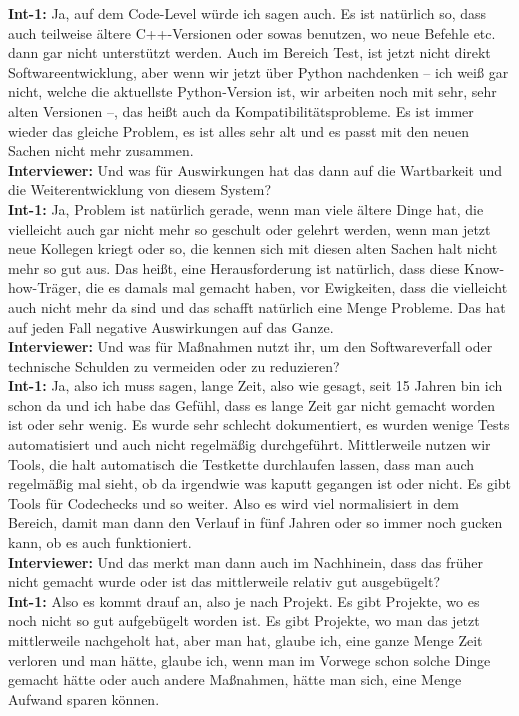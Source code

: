 \textbf{Int-1:} Ja, auf dem Code-Level würde ich sagen auch. Es ist natürlich so, dass auch teilweise ältere C++-Versionen oder sowas benutzen, wo neue Befehle etc. dann gar nicht unterstützt werden. Auch im Bereich Test, ist jetzt nicht direkt Softwareentwicklung, aber wenn wir jetzt über Python nachdenken – ich weiß gar nicht, welche die aktuellste Python-Version ist, wir arbeiten noch mit sehr, sehr alten Versionen –, das heißt auch da Kompatibilitätsprobleme. Es ist immer wieder das gleiche Problem, es ist alles sehr alt und es passt mit den neuen Sachen nicht mehr zusammen.\\
\textbf{Interviewer:} Und was für Auswirkungen hat das dann auf die Wartbarkeit und die Weiterentwicklung von diesem System?\\
\textbf{Int-1:} Ja, Problem ist natürlich gerade, wenn man viele ältere Dinge hat, die vielleicht auch gar nicht mehr so geschult oder gelehrt werden, wenn man jetzt neue Kollegen kriegt oder so, die kennen sich mit diesen alten Sachen halt nicht mehr so gut aus. Das heißt, eine Herausforderung ist natürlich, dass diese Know-how-Träger, die es damals mal gemacht haben, vor Ewigkeiten, dass die vielleicht auch nicht mehr da sind und das schafft natürlich eine Menge Probleme. Das hat auf jeden Fall negative Auswirkungen auf das Ganze.\\
\textbf{Interviewer:} Und was für Maßnahmen nutzt ihr, um den Softwareverfall oder technische Schulden zu vermeiden oder zu reduzieren?\\
\textbf{Int-1:} Ja, also ich muss sagen, lange Zeit, also wie gesagt, seit 15 Jahren bin ich schon da und ich habe das Gefühl, dass es lange Zeit gar nicht gemacht worden ist oder sehr wenig. Es wurde sehr schlecht dokumentiert, es wurden wenige Tests automatisiert und auch nicht regelmäßig durchgeführt. Mittlerweile nutzen wir Tools, die halt automatisch die Testkette durchlaufen lassen, dass man auch regelmäßig mal sieht, ob da irgendwie was kaputt gegangen ist oder nicht. Es gibt Tools für Codechecks und so weiter. Also es wird viel normalisiert in dem Bereich, damit man dann den Verlauf in fünf Jahren oder so immer noch gucken kann, ob es auch funktioniert.\\
\textbf{Interviewer:} Und das merkt man dann auch im Nachhinein, dass das früher nicht gemacht wurde oder ist das mittlerweile relativ gut ausgebügelt?\\
\textbf{Int-1:} Also es kommt drauf an, also je nach Projekt. Es gibt Projekte, wo es noch nicht so gut aufgebügelt worden ist. Es gibt Projekte, wo man das jetzt mittlerweile nachgeholt hat, aber man hat, glaube ich, eine ganze Menge Zeit verloren und man hätte, glaube ich, wenn man im Vorwege schon solche Dinge gemacht hätte oder auch andere Maßnahmen, hätte man sich, eine Menge Aufwand sparen können.\\
